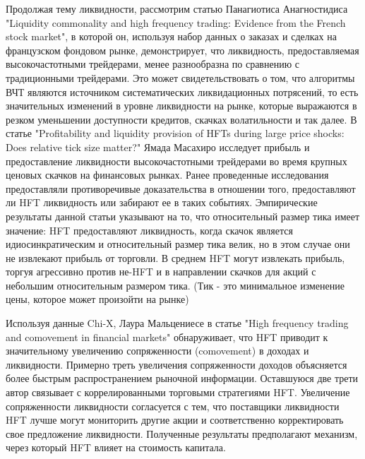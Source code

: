 \documentclass{letask}
\begin{document}
Продолжая тему ликвидности, рассмотрим статью Панагиотиса Анагностидиса "Liquidity commonality and high frequency trading: Evidence from the French stock market", в которой он, используя набор данных о заказах и сделках на французском фондовом рынке, демонстрирует, что ликвидность, предоставляемая высокочастотными трейдерами, менее разнообразна по сравнению с традиционными трейдерами. Это может свидетельствовать о том, что алгоритмы ВЧТ являются источником систематических ликвидационных потрясений, то есть значительных изменений в уровне ликвидности на рынке, которые выражаются в резком уменьшении доступности кредитов, скачках волатильности и так далее. В статье "Profitability and liquidity provision of HFTs during large price shocks: Does relative tick size matter?" Ямада Масахиро исследует прибыль и предоставление ликвидности высокочастотными трейдерами во время крупных ценовых скачков на финансовых рынках. Ранее проведенные исследования предоставляли противоречивые доказательства в отношении того, предоставляют ли HFT ликвидность или забирают ее в таких событиях. Эмпирические результаты данной статьи указывают на то, что относительный размер тика имеет значение: HFT предоставляют ликвидность, когда скачок является идиосинкратическим и относительный размер тика велик, но в этом случае они не извлекают прибыль от торговли. В среднем HFT могут извлекать прибыль, торгуя агрессивно против не-HFT и в направлении скачков для акций с небольшим относительным размером тика. (Тик - это минимальное изменение цены, которое может произойти на рынке)

Используя данные Chi-X, Лаура Мальцениесе в статье "High frequency trading and comovement in financial markets" обнаруживает, что HFT приводит к значительному увеличению сопряженности (comovement) в доходах и ликвидности. Примерно треть увеличения сопряженности доходов объясняется более быстрым распространением рыночной информации. Оставшуюся две трети автор связывает с коррелированными торговыми стратегиями HFT. Увеличение сопряженности ликвидности согласуется с тем, что поставщики ликвидности HFT лучше могут мониторить другие акции и соответственно корректировать свое предложение ликвидности. Полученные результаты предполагают механизм, через который HFT влияет на стоимость капитала.
\end{document}
